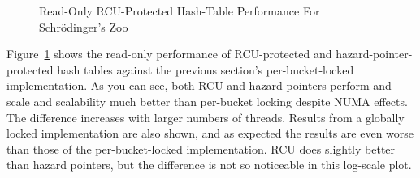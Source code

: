 \begin{figure}[tb]
\centering
{}
\caption{Read-Only RCU-Protected Hash-Table Performance For Schr\"odinger's Zoo}
\label{fig:datastruct:Read-Only RCU-Protected Hash-Table Performance For Schroedinger's Zoo}
\end{figure}

Figure~\ref{fig:datastruct:Read-Only RCU-Protected Hash-Table Performance For Schroedinger's Zoo}
shows the read-only performance of RCU-protected and hazard-pointer-protected
hash tables against the previous section's per-bucket-locked implementation.
As you can see, both RCU and hazard pointers perform and scale and
scalability much better than per-bucket locking despite NUMA effects.
The difference increases with larger numbers of threads.
Results from a globally locked implementation are also shown, and as expected
the results are even worse than those of the per-bucket-locked implementation.
RCU does slightly better than hazard pointers, but the difference is not
so noticeable in this log-scale plot.

